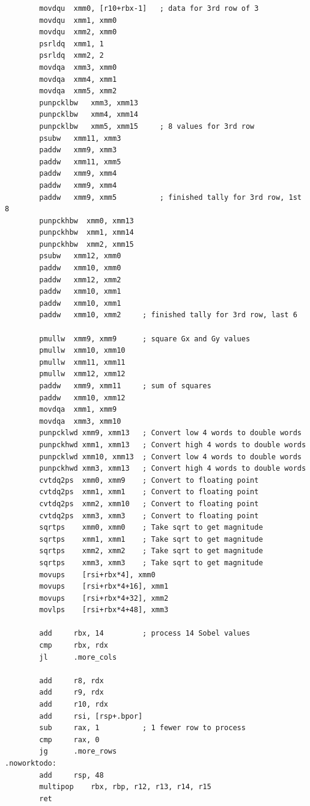 \documentclass[11pt,b5paper]{book}
\begin{document}
\begin{verbatim}
        movdqu  xmm0, [r10+rbx-1]   ; data for 3rd row of 3
        movdqu  xmm1, xmm0
        movdqu  xmm2, xmm0
        psrldq  xmm1, 1
        psrldq  xmm2, 2
        movdqa  xmm3, xmm0
        movdqa  xmm4, xmm1
        movdqa  xmm5, xmm2
        punpcklbw   xmm3, xmm13
        punpcklbw   xmm4, xmm14
        punpcklbw   xmm5, xmm15     ; 8 values for 3rd row
        psubw   xmm11, xmm3
        paddw   xmm9, xmm3
        paddw   xmm11, xmm5
        paddw   xmm9, xmm4
        paddw   xmm9, xmm4
        paddw   xmm9, xmm5          ; finished tally for 3rd row, 1st 8
        punpckhbw  xmm0, xmm13
        punpckhbw  xmm1, xmm14
        punpckhbw  xmm2, xmm15
        psubw   xmm12, xmm0
        paddw   xmm10, xmm0
        paddw   xmm12, xmm2
        paddw   xmm10, xmm1
        paddw   xmm10, xmm1
        paddw   xmm10, xmm2     ; finished tally for 3rd row, last 6

        pmullw  xmm9, xmm9      ; square Gx and Gy values
        pmullw  xmm10, xmm10
        pmullw  xmm11, xmm11
        pmullw  xmm12, xmm12
        paddw   xmm9, xmm11     ; sum of squares
        paddw   xmm10, xmm12
        movdqa  xmm1, xmm9
        movdqa  xmm3, xmm10
        punpcklwd xmm9, xmm13   ; Convert low 4 words to double words
        punpckhwd xmm1, xmm13   ; Convert high 4 words to double words
        punpcklwd xmm10, xmm13  ; Convert low 4 words to double words
        punpckhwd xmm3, xmm13   ; Convert high 4 words to double words
        cvtdq2ps  xmm0, xmm9    ; Convert to floating point
        cvtdq2ps  xmm1, xmm1    ; Convert to floating point
        cvtdq2ps  xmm2, xmm10   ; Convert to floating point
        cvtdq2ps  xmm3, xmm3    ; Convert to floating point
        sqrtps    xmm0, xmm0    ; Take sqrt to get magnitude
        sqrtps    xmm1, xmm1    ; Take sqrt to get magnitude
        sqrtps    xmm2, xmm2    ; Take sqrt to get magnitude
        sqrtps    xmm3, xmm3    ; Take sqrt to get magnitude
        movups    [rsi+rbx*4], xmm0
        movups    [rsi+rbx*4+16], xmm1
        movups    [rsi+rbx*4+32], xmm2
        movlps    [rsi+rbx*4+48], xmm3

        add     rbx, 14         ; process 14 Sobel values
        cmp     rbx, rdx
        jl      .more_cols
        
        add     r8, rdx
        add     r9, rdx
        add     r10, rdx
        add     rsi, [rsp+.bpor]
        sub     rax, 1          ; 1 fewer row to process
        cmp     rax, 0
        jg      .more_rows
.noworktodo:
        add     rsp, 48
        multipop    rbx, rbp, r12, r13, r14, r15
        ret
\end{verbatim}
\end{document}
